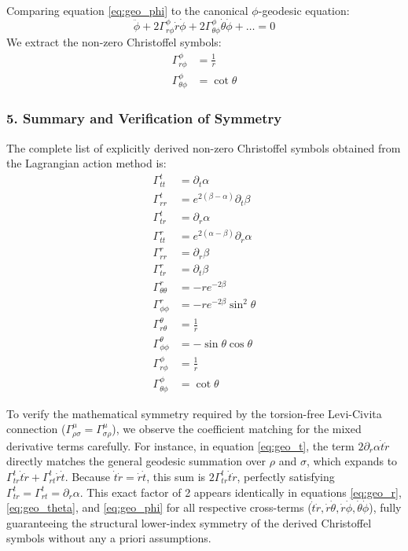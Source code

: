 \documentclass[11pt, a4paper]{report}
\begin{document}
Comparing equation \eqref{eq:geo_phi} to the canonical $\phi$-geodesic equation:
\begin{equation}
    \ddot{\phi} + 2\Gamma^\phi_{r\phi}\dot{r}\dot{\phi} + 2\Gamma^\phi_{\theta\phi}\dot{\theta}\dot{\phi} + \dots = 0
\end{equation}
We extract the non-zero Christoffel symbols:
\begin{align}
    \Gamma^\phi_{r\phi} &= \frac{1}{r} \\
    \Gamma^\phi_{\theta\phi} &= \cot\theta
\end{align}

\subsubsection*{5. Summary and Verification of Symmetry}

The complete list of explicitly derived non-zero Christoffel symbols obtained from the Lagrangian action method is:
\begin{align}
    \Gamma^t_{tt} &= \partial_t \alpha \\
    \Gamma^t_{rr} &= e^{2(\beta - \alpha)} \partial_t \beta \\
    \Gamma^t_{tr} &= \partial_r \alpha \\
    \Gamma^r_{tt} &= e^{2(\alpha - \beta)} \partial_r \alpha \\
    \Gamma^r_{rr} &= \partial_r \beta \\
    \Gamma^r_{tr} &= \partial_t \beta \\
    \Gamma^r_{\theta\theta} &= -r e^{-2\beta} \\
    \Gamma^r_{\phi\phi} &= -r e^{-2\beta} \sin^2\theta \\
    \Gamma^\theta_{r\theta} &= \frac{1}{r} \\
    \Gamma^\theta_{\phi\phi} &= -\sin\theta \cos\theta \\
    \Gamma^\phi_{r\phi} &= \frac{1}{r} \\
    \Gamma^\phi_{\theta\phi} &= \cot\theta
\end{align}

To verify the mathematical symmetry required by the torsion-free Levi-Civita connection ($\Gamma^\mu_{\rho\sigma} = \Gamma^\mu_{\sigma\rho}$), we observe the coefficient matching for the mixed derivative terms carefully. For instance, in equation \eqref{eq:geo_t}, the term $2\partial_r \alpha \dot{t}\dot{r}$ directly matches the general geodesic summation over $\rho$ and $\sigma$, which expands to $\Gamma^t_{tr}\dot{t}\dot{r} + \Gamma^t_{rt}\dot{r}\dot{t}$. Because $\dot{t}\dot{r} = \dot{r}\dot{t}$, this sum is $2\Gamma^t_{tr}\dot{t}\dot{r}$, perfectly satisfying $\Gamma^t_{tr} = \Gamma^t_{rt} = \partial_r \alpha$. This exact factor of 2 appears identically in equations \eqref{eq:geo_r}, \eqref{eq:geo_theta}, and \eqref{eq:geo_phi} for all respective cross-terms ($\dot{t}\dot{r}, \dot{r}\dot{\theta}, \dot{r}\dot{\phi}, \dot{\theta}\dot{\phi}$), fully guaranteeing the structural lower-index symmetry of the derived Christoffel symbols without any a priori assumptions.
\end{document}
